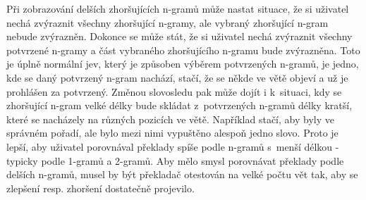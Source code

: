Při zobrazování delších zhoršujících n-gramů může nastat situace,
  že si uživatel nechá zvýraznit všechny zhoršující n-gramy,
  ale vybraný zhoršující n-gram nebude zvýrazněn.
Dokonce se může stát, 
  že si uživatel nechá zvýraznit všechny potvrzené n-gramy
  a část vybraného zhoršujícího n-gramu bude zvýrazněna.
Toto je úplně normální jev,
  který je způsoben výběrem potvrzených n-gramů,
  je jedno, kde se daný potvrzený n-gram nachází,
  stačí,
  že se někde ve větě objeví a už je prohlášen za potvrzený.
Změnou slovosledu pak může dojít i k~situaci,
  kdy se zhoršující n-gram velké délky bude skládat z~potvrzených n-gramů délky kratší,
  které se nacházely na různých pozicích ve větě. 
Například stačí, aby byly ve správném pořadí,
  ale bylo mezi nimi vypuštěno alespoň jedno slovo.
Proto je lepší,
  aby uživatel porovnával překlady spíše podle n-gramů s~menší délkou -
  typicky podle 1-gramů a 2-gramů.
Aby mělo smysl porovnávat překlady podle delších n-gramů,
  musel by být překladač otestován na velké počtu vět tak,
  aby se zlepšení resp. zhoršení dostatečně projevilo.

